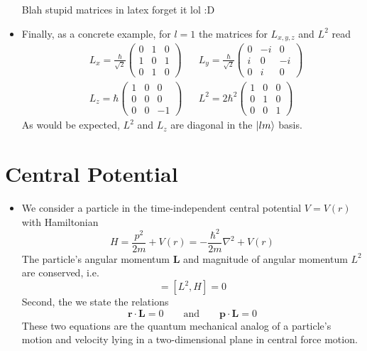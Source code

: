 \documentclass[11pt, a4paper]{article}
\renewcommand{\laplacian}{\nabla^{2}}
\newcommand{\eqtext}[1]{\qquad \text{#1} \qquad}
\newcommand{\Ham}{Hamiltonian\xspace}
\renewcommand{\vec}[1]{\bm{#1}}  %
\renewcommand{\r}{\vec{r}}  %
\renewcommand{\L}{\vec{L}}  %
\begin{document}
\begin{itemize}
	Blah stupid matrices in latex forget it lol :D
	
	\fi
	
	\item Finally, as a concrete example, for $ l = 1 $ the matrices for $ L_{x, y, z} $ and $ L^{2} $ read
	\begin{align*}
		& L_{x} = \frac{\hbar}{\sqrt{2}} 
		\begin{pmatrix}
			0 & 1 & 0\\
			1 & 0 & 1\\
			0 & 1 & 0
		\end{pmatrix}
		&&
		L_{y} = \frac{\hbar}{\sqrt{2}} 
		\begin{pmatrix}
			0 & -i & 0 \\
			i & 0 & -i \\
			0 & i & 0
		\end{pmatrix}\\
		& L_{z} = \hbar
		\begin{pmatrix}
			1 & 0 & 0\\
			0 & 0 & 0\\
			0 & 0 & -1
		\end{pmatrix}
		&&
		L^{2} = 2\hbar^{2}
		\begin{pmatrix}
			1 & 0 & 0\\
			0 & 1 & 0\\
			0 & 0 & 1
		\end{pmatrix}
	\end{align*}
	As would be expected, $ L^{2} $ and $ L_{z} $ are diagonal in the $ \ket{lm} $ basis.
	
\end{itemize}


\newpage
\section{Central Potential}
\begin{itemize}
	\item We consider a particle in the time-independent central potential $ V = V(r) $ with \Ham 
	\begin{equation*}
		H = \frac{p^{2}}{2m} + V(r) = -\frac{\hbar^{2}}{2m} \laplacian + V(r)
	\end{equation*}
	The particle's angular momentum $ \L $ and magnitude of angular momentum $ L^{2} $ are conserved, i.e.
	\begin{equation*}
		[\L, H] = [L^{2}, H] = 0
	\end{equation*}
	Second, the we state the relations
	\begin{equation*}
		\r \cdot \L = 0 \eqtext{and} \vec{p} \cdot \L = 0
	\end{equation*}
	These two equations are the quantum mechanical analog of a particle's motion and velocity lying in a two-dimensional plane in central force motion.
	
\end{itemize}
\end{document}
